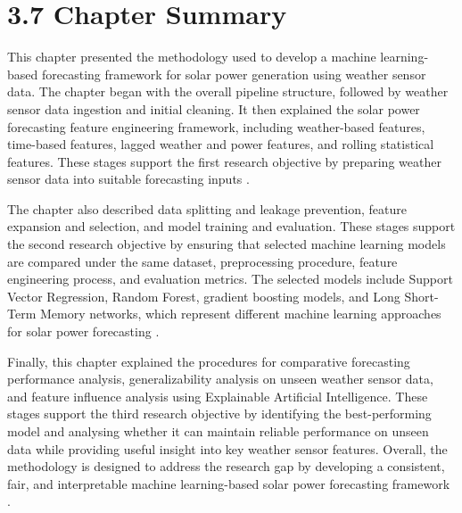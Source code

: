 \section{3.7 Chapter Summary}

This chapter presented the methodology used to develop a machine learning-based forecasting framework for solar power generation using weather sensor data. The chapter began with the overall pipeline structure, followed by weather sensor data ingestion and initial cleaning. It then explained the solar power forecasting feature engineering framework, including weather-based features, time-based features, lagged weather and power features, and rolling statistical features. These stages support the first research objective by preparing weather sensor data into suitable forecasting inputs \parencite{JnanaVarshitha2025, TsaiLo2025, CarvalhoJunior2025}.

The chapter also described data splitting and leakage prevention, feature expansion and selection, and model training and evaluation. These stages support the second research objective by ensuring that selected machine learning models are compared under the same dataset, preprocessing procedure, feature engineering process, and evaluation metrics. The selected models include Support Vector Regression, Random Forest, gradient boosting models, and Long Short-Term Memory networks, which represent different machine learning approaches for solar power forecasting \parencite{Bakht2025, Alhassan2025, Eren2025}.

Finally, this chapter explained the procedures for comparative forecasting performance analysis, generalizability analysis on unseen weather sensor data, and feature influence analysis using Explainable Artificial Intelligence. These stages support the third research objective by identifying the best-performing model and analysing whether it can maintain reliable performance on unseen data while providing useful insight into key weather sensor features. Overall, the methodology is designed to address the research gap by developing a consistent, fair, and interpretable machine learning-based solar power forecasting framework \parencite{ArellanosTafur2025, Duvuru2026, Ma2025}.










